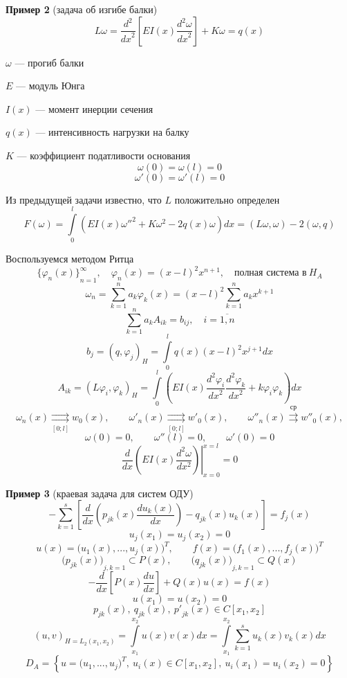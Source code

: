 \documentclass[12pt, a4paper]{article}
\newcommand{\Int}{\int\limits}
\newcommand{\Sum}{\sum\limits}
\begin{document}
\textbf{Пример 2} (задача об изгибе балки)
\[ L\omega = \frac{d^2}{{dx}^2} \left[E I(x) \frac{d^2 \omega }{{dx}^2}\right] + K\omega = q(x)\]

$ \omega $ --- прогиб балки

$ E $ --- модуль Юнга

$ I(x) $ --- момент инерции сечения

$ q(x) $ --- интенсивность нагрузки на балку

$ K $ --- коэффициент податливости основания
\[ \omega (0) = \omega (l) = 0 \]
\[ \omega'(0) = \omega'(l) = 0 \]

Из предыдущей задачи известно, что $L$ положительно определен
\[ F(\omega) = \Int_{0}^{l} \left(E I(x) {\omega''}^2 + K\omega^2 - 2q(x) \omega \right) dx = (L\omega , \omega) -2 (\omega, q)\]

Воспользуемся методом Ритца
\[ {\{\varphi_n (x)\}}^{\infty}_{n=1}, \quad \varphi_n (x) = {(x-l)}^2 x^{n+1}, \quad \text{полная система в} \ H_A \]
\[ \omega_n = \Sum_{k=1}^{n} a_k \varphi_k (x) = {(x-l)}^2 \Sum_{k=1}^{n} a_k x^{k+1} \]
\[ \Sum_{k=1}^{n} a_k A_{ik} = b_{ij}, \quad i=\overline{1, n} \]
\[ b_j = {(q, \varphi_j)}_H = \Int_{0}^{l } q(x) {(x-l)}^2 x^{j+1} dx \]
\[ A_{ik} = {(L \varphi_i, \varphi_k)}_H = \Int_{0}^{l} \left(E I(x) \frac{d^2 \varphi_i}{{dx}^2} \frac{d^2 \varphi_k}{{dx}^2} + k\varphi_i \varphi_k \right) dx \]
\[ \omega_n(x) \underset{[0;l]}{\rightrightarrows} w_0(x), \qquad {\omega'}_n(x) \underset{[0;l]}{\rightrightarrows} {w'}_0(x), \qquad {\omega''}_n(x) \overset{\text{ср}}{\rightrightarrows} {w''}_0(x), \]
\[ \omega(0) = 0, \qquad \omega''(l) = 0, \qquad \omega' (0) = 0 \]
\[ {\left.{\frac{d}{dx} \left(E I(x) \frac{d^2 \omega }{d x^2}\right)}\right|}^{x=l}_{x=0} = 0 \]

\textbf{Пример 3} (краевая задача для систем ОДУ)
\[ - \Sum_{k=1}^{s} \left[ \frac{d}{dx} \left( p_{jk}(x) \frac{du_k (x)}{dx} \right) - q_{jk}(x) u_k (x) \right] = f_j(x) \]
\[ u_j(x_1) = u_j(x_2) = 0 \]
\[ u(x) = {\bigl(u_1(x), ..., u_j(x)\bigr)}^T, \qquad f(x) = {\bigl(f_1(x), ..., f_j(x)\bigr)}^T \]
\[ {\bigl( p_{jk}(x) \bigr)}_{j,k=1} \subset P(x), \qquad {\bigl( q_{jk}(x) \bigr)}_{j,k=1} \subset Q(x) \]
\[ - \frac{d}{dx} \left[P(x) \frac{du}{dx} \right] + Q(x) u(x) = f(x) \]
\[ u(x_1) = u (x_2) = 0 \]
\[ p_{jk}(x), \ q_{jk}(x), \ {p'}_{jk} (x) \in C[x_1, x_2] \]
\[ {(u, v)}_{H= L_2(x_1, x_2)} = \Int_{x_1}^{x_2} u (x) v(x) dx = \Int_{x_1}^{x_2} \Sum_{k=1}^{s} u_k(x) v_k (x) dx \]
\[ D_A = \left\{ u = {\bigl(u_1, ..., u_j\bigr)}^T, \ u_i(x) \in C[x_1, x_2], \ u_i(x_1) = u_i(x_2) = 0 \right\} \]
\end{document}
